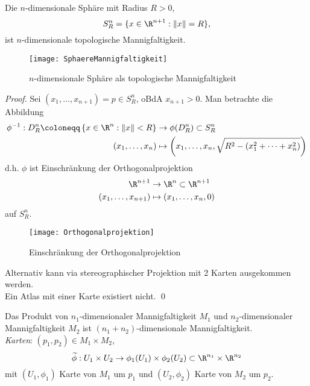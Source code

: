\begin{example}
\begin{enumerate}
    \begin{minipage}{.45\textwidth}
      \item Die \( n \)-dimensionale Sphäre mit Radius \( R > 0 \),
      \begin{equation*}
        S^n_R = \{ x \in \R^{n+1} : \Vert x \Vert = R \}\text{,}
      \end{equation*}
      ist \( n \)-dimensionale topologische Mannigfaltigkeit.
    \end{minipage}
    \hfill
    \begin{minipage}{.45\textwidth}
      \begin{figure}[H]
        \texttt{[image: SphaereMannigfaltigkeit]}
        \caption{\( n \)-dimensionale Sphäre als topologische Mannigfaltigkeit}
      \end{figure}
    \end{minipage}
    \begin{proof}
      Sei \( (x_1, \dots, x_{n+1}) = p \in S^n_R \), oBdA \( x_{n+1} > 0 \). Man betrachte die Abbildung
      \begin{align*}
        \phi^{-1} : D^n_R \coloneqq \left \{ x \in \R^n : \Vert x \Vert < R \right \} &\to \phi(D^n_R) \subset S^n_R \\
          (x_1, \dots, x_n) &\mapsto \left(x_1, \dots, x_n, \sqrt{R^2-(x_1^2 + \cdots + x_n^2)}\right)
      \end{align*}
      d.h. \( \phi \) ist Einschränkung der Orthogonalprojektion
      \begin{align*}
        \R^{n+1} &\to \R^n \subset \R^{n+1} \\
          (x_1, \dots, x_{n+1}) &\mapsto (x_1, \dots, x_n, 0)
      \end{align*}
      auf \( S_R^n \).
      \begin{figure}[H]
        \texttt{[image: Orthogonalprojektion]}
        \caption{Einschränkung der Orthogonalprojektion}
      \end{figure}
      Alternativ kann via stereographischer Projektion mit \( 2 \) Karten ausgekommen werden. \\
      Ein Atlas mit einer Karte existiert nicht. \qed{}
    \end{proof}
    \item Das Produkt von \( n_1 \)-dimensionaler Mannigfaltigkeit \( M_1 \) und \( n_2 \)-dimensionaler Mannigfaltigkeit \( M_2 \) ist \( (n_1+n_2) \)-dimensionale Mannigfaltigkeit. \\
    \emph{Karten}: \( (p_1, p_2) \in M_1 \times M_2 \),
    \begin{equation*}
      \widetilde{\phi} : U_1 \times U_2 \to \phi_1(U_1) \times \phi_2(U_2) \subset \R^{n_1} \times \R^{n_2}
    \end{equation*}
    mit \( (U_1, \phi_1) \) Karte von \( M_1 \) um \( p_1 \) und \( (U_2, \phi_2) \) Karte von \( M_2 \) um \( p_2 \).
  \end{enumerate}
\end{example}

